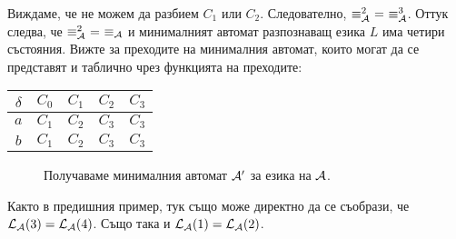 \begin{extra2}
\begin{solution}
\begin{itemize}
      
      Виждаме, че не можем да разбием $C_1$ или $C_2$.
      Следователно, $\equiv^2_\A\ =\ \equiv^3_\A$.
      Оттук следва, че $\equiv^2_{\mathcal{A}}\ =\ \equiv_{\mathcal{A}}$ и минималният автомат разпознаващ езика $L$
      има четири състояния. Вижте  за преходите на минималния автомат,
      които могат да се представят и таблично чрез функцията на преходите:

      \begin{tabular}{|c|c|c|c|c|}
        \hline
        $\delta$ & $C_0$ & $C_1$ & $C_2$ & $C_3$ \\
        \hline
        $a$ & $C_1$ & $C_2$ & $C_3$ & $C_3$ \\
        \hline
        $b$ & $C_1$ & $C_2$ & $C_3$ & $C_3$ \\
        \hline
      \end{tabular}
    \end{itemize}

    \begin{figure}[H]
      \centering
      \caption{Получаваме минималния автомат $\mathcal{A}'$ за езика на $\mathcal{A}$.}
      \label{fig:min2}
    \end{figure}

  \end{solution}
  
  \begin{remark}
    Както в предишния пример, тук също може директно да се съобрази, че $\mathcal{L}_{\mathcal{A}}(3) = \mathcal{L}_{\mathcal{A}}(4)$.
    Също така и $\mathcal{L}_{\mathcal{A}}(1) = \mathcal{L}_{\mathcal{A}}(2)$.
  \end{remark}

\end{extra2}


